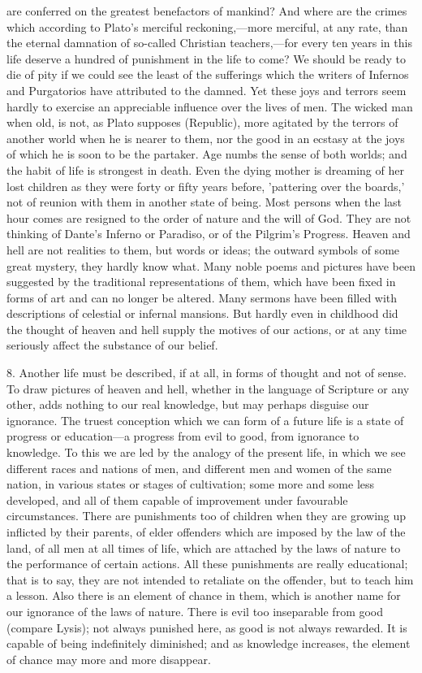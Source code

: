 are conferred on the greatest benefactors of mankind? And where are the
crimes which according to Plato's merciful reckoning,—more merciful,
at any rate, than the eternal damnation of so-called Christian teachers,—for
every ten years in this life deserve a hundred of punishment in the life
to come? We should be ready to die of pity if we could see the least of
the sufferings which the writers of Infernos and Purgatorios have
attributed to the damned. Yet these joys and terrors seem hardly to
exercise an appreciable influence over the lives of men. The wicked man
when old, is not, as Plato supposes (Republic), more agitated by the
terrors of another world when he is nearer to them, nor the good in an
ecstasy at the joys of which he is soon to be the partaker. Age numbs the
sense of both worlds; and the habit of life is strongest in death. Even
the dying mother is dreaming of her lost children as they were forty or
fifty years before, 'pattering over the boards,' not of reunion with them
in another state of being. Most persons when the last hour comes are
resigned to the order of nature and the will of God. They are not thinking
of Dante's Inferno or Paradiso, or of the Pilgrim's Progress. Heaven and
hell are not realities to them, but words or ideas; the outward symbols of
some great mystery, they hardly know what. Many noble poems and pictures
have been suggested by the traditional representations of them, which have
been fixed in forms of art and can no longer be altered. Many sermons have
been filled with descriptions of celestial or infernal mansions. But
hardly even in childhood did the thought of heaven and hell supply the
motives of our actions, or at any time seriously affect the substance of
our belief.

8. Another life must be described, if at all, in forms of thought and not
of sense. To draw pictures of heaven and hell, whether in the language of
Scripture or any other, adds nothing to our real knowledge, but may
perhaps disguise our ignorance. The truest conception which we can form of
a future life is a state of progress or education—a progress from
evil to good, from ignorance to knowledge. To this we are led by the
analogy of the present life, in which we see different races and nations
of men, and different men and women of the same nation, in various states
or stages of cultivation; some more and some less developed, and all of
them capable of improvement under favourable circumstances. There are
punishments too of children when they are growing up inflicted by their
parents, of elder offenders which are imposed by the law of the land, of
all men at all times of life, which are attached by the laws of nature to
the performance of certain actions. All these punishments are really
educational; that is to say, they are not intended to retaliate on the
offender, but to teach him a lesson. Also there is an element of chance in
them, which is another name for our ignorance of the laws of nature. There
is evil too inseparable from good (compare Lysis); not always punished
here, as good is not always rewarded. It is capable of being indefinitely
diminished; and as knowledge increases, the element of chance may more and
more disappear.

